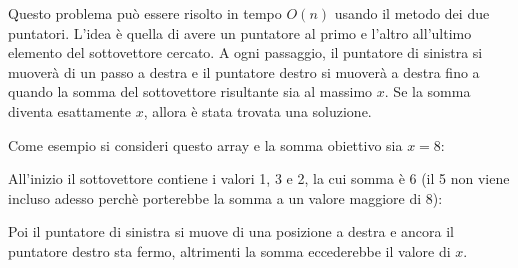 Questo problema può essere risolto in tempo
$O(n)$ usando il metodo dei due puntatori.
L'idea è quella di avere un puntatore al primo e 
l'altro all'ultimo elemento del sottovettore cercato.
A ogni passaggio, il puntatore di sinistra si muoverà 
di un passo a destra e il puntatore destro si muoverà a destra
fino a quando la somma del sottovettore risultante sia al massimo $x$.
Se la somma diventa esattamente $x$,
allora è stata trovata una soluzione.

Come esempio si consideri questo array e 
la somma obiettivo sia $x=8$:
\begin{center}
\end{center}

All'inizio il sottovettore contiene i valori
1, 3 e 2, la cui somma è 6 (il 5 non viene incluso adesso
perchè porterebbe la somma a un valore maggiore di 8):

\begin{center}
\end{center}

Poi il puntatore di sinistra si muove di una posizione a destra
e ancora il puntatore destro sta fermo, altrimenti la somma
eccederebbe il valore di $x$.

\begin{center}
\end{center}

